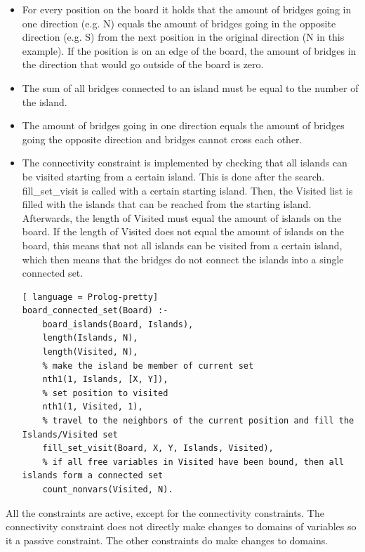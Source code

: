 \documentclass{report}
\begin{document}
\begin{itemize}
	\item For every position on the board it holds that the amount of bridges going in one direction (e.g. N) equals the amount of bridges going in the opposite direction (e.g. S) from the next position in the original direction (N in this example). If the position is on an edge of the board, the amount of bridges in the direction that would go outside of the board is zero.

        

    \item The sum of all bridges connected to an island must be equal to the number of the island.
        

    \item The amount of bridges going in one direction equals the amount of bridges going the opposite direction and bridges cannot cross each other.
        

    \item The connectivity constraint is implemented by checking that all islands can be visited starting from a certain island. This is done after the search. fill\_set\_visit is called with a certain starting island. Then, the Visited list is filled with the islands that can be reached from the starting island. Afterwards, the length of Visited must equal the amount of islands on the board. If the length of Visited does not equal the amount of islands on the board, this means that not all islands can be visited from a certain island, which then means that the bridges do not connect the islands into a single connected set.
\begin{lstlisting}[ language = Prolog-pretty]
board_connected_set(Board) :-
    board_islands(Board, Islands),
    length(Islands, N),
    length(Visited, N),
    % make the island be member of current set
    nth1(1, Islands, [X, Y]),
    % set position to visited
    nth1(1, Visited, 1),
    % travel to the neighbors of the current position and fill the Islands/Visited set
    fill_set_visit(Board, X, Y, Islands, Visited),
    % if all free variables in Visited have been bound, then all islands form a connected set
    count_nonvars(Visited, N).
\end{lstlisting}

\end{itemize}
All the constraints are active, except for the connectivity constraints. The connectivity constraint does not directly make changes to domains of variables so it a passive constraint. The other constraints do make changes to domains.
\end{document}
